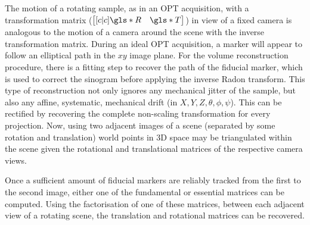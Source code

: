 \documentclass{osa-article}
\begin{document}
The motion of a rotating sample, as in an OPT acquisition, with a transformation matrix (\( \begin{bmatrix}[c|c] \gls*{R} & \gls*{T} \end{bmatrix}\)) in view of a fixed camera is analogous to the motion of a camera around the scene with the inverse transformation matrix. %
During an ideal OPT acquisition, a marker will appear to follow an elliptical path in the \(xy\) image plane.
For the volume reconstruction procedure, there is a fitting step to recover the path of the fiducial marker, which is used to correct the sinogram before applying the inverse Radon transform.
This type of reconstruction not only ignores any mechanical jitter of the sample, but also any affine, systematic, mechanical drift (in \(X,Y,Z,\theta,\phi,\psi \)). %
This can be rectified by recovering the complete non-scaling transformation for every projection.
Now, using two adjacent images of a scene (separated by some rotation and translation) world points in 3D space may be triangulated within the scene given the rotational and translational matrices of the respective camera views.



Once a sufficient amount of fiducial markers are reliably tracked from the first to the second image, either one of the fundamental or essential matrices can be computed.
Using the factorisation of one of these matrices, between each adjacent view of a rotating scene, the translation and rotational matrices can be recovered.
\end{document}
